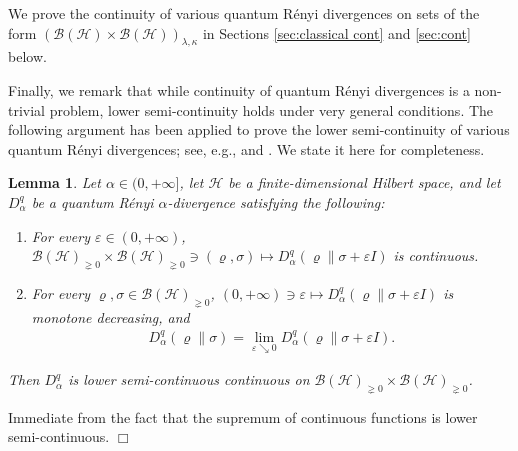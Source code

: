 \documentclass[unsortedaddress,superscriptaddress,pra,notitlepage]{revtex4}
\newtheorem{lemma}[definition]{Lemma}
\newenvironment{proof}[1][Proof]{\begin{trivlist}
\item[\hskip \labelsep {\bfseries #1}]}{\hfill$\Box$\end{trivlist}}
\def\B{{\mathcal B}}
\def\ep{\varepsilon}
\def\rho{\varrho}
\def\hil{{\mathcal H}}
\def\pne{_{\gneq 0}}
\def\pwr{\kappa}
\begin{document}
We prove the continuity of various quantum R\'enyi divergences on sets of the form
$(\B(\hil)\times\B(\hil))_{\lambda,\pwr}$ in Sections \ref{sec:classical cont} and \ref{sec:cont} below.
\medskip

Finally, we remark that while continuity of quantum R\'enyi divergences is a non-trivial problem, lower semi-continuity 
holds under very general conditions. The following argument has been applied to 
prove the lower semi-continuity of various quantum R\'enyi divergences; see, e.g., 
\cite[Lemma 3.26, Corollary 3.27]{MO-cqconv} and 
\cite[Lemma IV.8]{MO-cqconv-cc}. We state it here for completeness.

\begin{lemma}\label{lemma:Renyi lsc}
Let $\alpha\in(0,+\infty]$, let $\hil$ be a finite-dimensional Hilbert space, and let $D_{\alpha}^q$ be a quantum R\'enyi 
$\alpha$-divergence satisfying the following:
\begin{enumerate}
\item
For every $\ep\in(0,+\infty)$, $\B(\hil)\pne\times\B(\hil)\pne\ni(\rho,\sigma)\mapsto
D_{\alpha}^q(\rho\|\sigma+\ep I)$ is continuous. 
\item
For every $\rho,\sigma\in\B(\hil)\pne$, $(0,+\infty)\ni\ep\mapsto D_{\alpha}^q(\rho\|\sigma+\ep I)$ is monotone decreasing, and 
\begin{align*}
D_{\alpha}^q(\rho\|\sigma)
=
\lim_{\ep\searrow 0}D_{\alpha}^q(\rho\|\sigma+\ep I).
\end{align*}
\end{enumerate}
Then $D_{\alpha}^q$ is lower semi-continuous continuous on $\B(\hil)\pne\times\B(\hil)\pne$.
\end{lemma}
\begin{proof}
Immediate from the fact that the supremum of continuous functions is lower semi-continuous.
\end{proof}
\end{document}
